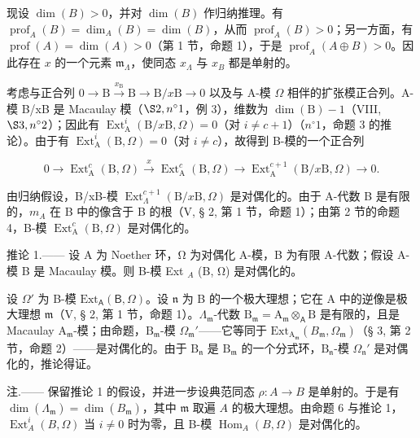 现设 \(\dim(B) > 0\)，并对 \(\dim(B)\) 作归纳推理。有 \(\operatorname{prof}_{A}(B) = \dim_{A}(B) = \dim(B)\)，从而 \(\operatorname{prof}_{A}(B) > 0\)；另一方面，有 \(\operatorname{prof}(A) = \dim(A) > 0\)（第 1 节，命题 1），于是 \(\operatorname{prof}_{A}(A \oplus B) > 0\)。因此存在 \(x\) 的一个元素 \(\mathfrak{m}_{\Lambda}\)，使同态 \(x_{\Lambda}\) 与 \(x_{B}\) 都是单射的。

考虑与正合列 \(0 \to \mathrm{B} \xrightarrow{x_{\mathrm{B}}} \mathrm{B} \longrightarrow \mathrm{B}/x\mathrm{B} \to 0\) 以及与 A-模 \(\Omega\) 相伴的扩张模正合列。A-模 B/xB 是 Macaulay 模（\(\S 2, n^{\circ} 1\)，例 3），维数为 \(\dim(\mathrm{B}) - 1\)（VIII, \(\S 3, n^{\circ} 2\)）；因此有 \(\operatorname{Ext}_{\mathrm{A}}^{i}(\mathrm{B}/x\mathrm{B}, \Omega) = 0\)（对 \(i \neq c + 1\)）（\(n^{\circ} 1\)，命题 3 的推论）。由于有 \(\operatorname{Ext}_{\mathrm{A}}^{i}(\mathrm{B}, \Omega) = 0\)（对 \(i \neq c\)），故得到 B-模的一个正合列

\[
0 \rightarrow \operatorname{Ext} _ {\mathrm{A}} ^ {c} (\mathrm{B}, \Omega) \xrightarrow {x} \operatorname{Ext} _ {\mathrm{A}} ^ {c} (\mathrm{B}, \Omega) \longrightarrow \operatorname{Ext} _ {\mathrm{A}} ^ {c + 1} (\mathrm{B} / x \mathrm{B}, \Omega) \rightarrow 0.
\]

由归纳假设，B/xB-模 \(\operatorname{Ext}_{\Lambda}^{c+1}(\mathrm{B}/x\mathrm{B},\Omega)\) 是对偶化的。由于 A-代数 B 是有限的，\(m_{A}\) 在 B 中的像含于 B 的根（V, § 2, 第 1 节，命题 1）；由第 2 节的命题 4，B-模 \(\operatorname{Ext}_{\mathrm{A}}^{c}(\mathrm{B},\Omega)\) 是对偶化的。

推论 1.—— 设 A 为 Noether 环，Ω 为对偶化 A-模，B 为有限 A-代数；假设 A-模 B 是 Macaulay 模。则 B-模 Ext \(_{A}\) (B, Ω) 是对偶化的。

设 \(\Omega'\) 为 B-模 \(\mathrm{Ext}_{\mathsf{A}}(\mathsf{B},\Omega)\)。设 \(\mathfrak{n}\) 为 B 的一个极大理想；它在 A 中的逆像是极大理想 \(\mathfrak{m}\)（V, § 2, 第 1 节，命题 1）。\(\Lambda_{\mathfrak{m}}\)-代数 \(\mathrm{B}_{\mathfrak{m}} = \mathrm{A}_{\mathfrak{m}} \otimes_{\mathsf{A}} \mathrm{B}\) 是有限的，且是 Macaulay \(\mathrm{A}_{\mathfrak{m}}\)-模；由命题，\(\mathrm{B}_{\mathfrak{m}}\)-模 \(\Omega_{\mathfrak{m}}'\)——它等同于 \(\mathrm{Ext}_{\mathrm{A}_{\mathfrak{m}}}(B_{\mathfrak{m}},\Omega_{\mathfrak{m}})\)（§ 3, 第 2 节，命题 2）——是对偶化的。由于 \(\mathrm{B}_{\mathfrak{n}}\) 是 \(\mathrm{B}_{\mathfrak{m}}\) 的一个分式环，\(\mathrm{B}_{\mathfrak{n}}\)-模 \(\Omega_{\mathfrak{n}}'\) 是对偶化的，推论得证。

注.—— 保留推论 1 的假设，并进一步设典范同态 \(\rho : A \to B\) 是单射的。于是有 \(\dim(\Lambda_{\mathfrak{m}}) = \dim(B_{\mathfrak{m}})\)，其中 \(\mathfrak{m}\) 取遍 \(A\) 的极大理想。由命题 6 与推论 1，\(\operatorname{Ext}_{A}^{i}(B, \Omega)\) 当 \(i \neq 0\) 时为零，且 B-模 \(\operatorname{Hom}_{A}(B, \Omega)\) 是对偶化的。

